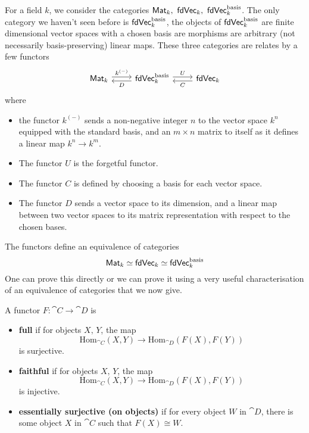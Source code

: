 \begin{example}\label{vectorspace}
For a field $k$, we consider the categories $\ncat{Mat}_k,\ \ncat{fdVec}_k,\ \ncat{fdVec}^{\text{basis}}_k$. The only category we haven't seen before is $\mathsf{fdVec}^{\text{basis}}_k$, the objects of $\mathsf{fdVec}^{\text{basis}}_k$ are finite dimensional vector spaces with a chosen basis are morphisms are arbitrary (not necessarily basis-preserving) linear maps. These three categories are relates by a few functors
\[\begin{tikzcd}
\ncat{Mat}_k \arrow[r, shift left, "k^{(-)}"] & \ncat{fdVec}^{\text{basis}}_k \arrow[r, shift left, "U"] \arrow[l, shift left, "D"] & \ncat{fdVec}_k \arrow[l, shift left, "C"]
\end{tikzcd}\]
where
\begin{itemize}
\item the functor $k^{(-)}$ sends a non-negative integer $n$ to the vector space $k^n$ equipped with the standard basis, and an $m\times n$ matrix to itself as it defines a linear map $k^n \to k^m$.
\item The functor $U$ is the forgetful functor.
\item The functor $C$ is defined by choosing a basis for each vector space.
\item The functor $D$ sends a vector space to its dimension, and a linear map between two vector spaces to its matrix representation with respect to the chosen bases.
\end{itemize}
The functors define an equivalence of categories
\[\mathsf{Mat}_k \simeq \mathsf{fdVec}_k \simeq \mathsf{fdVec}^{\text{basis}}_k\]
One can prove this directly or we can prove it using a very useful characterisation of an equivalence of categories that we now give.
\end{example}


\begin{definition}
A functor $F:\cat{C} \to \cat{D}$ is
\begin{itemize}
\item \textbf{full} if for objects $X,\,Y$, the map
\[\mathrm{Hom}_{\cat{C}}(X,Y) \to \mathrm{Hom}_{\cat{D}}(F(X),F(Y))\]
is surjective.
\item \textbf{faithful} if for objects $X,\,Y$, the map
\[\mathrm{Hom}_{\cat{C}}(X,Y) \to \mathrm{Hom}_{\cat{D}}(F(X),F(Y))\]
is injective.
\item \textbf{essentially surjective (on objects)} if for every object $W$ in $\cat{D}$, there is some object $X$ in $\cat{C}$ such that $F(X) \cong W$.
\end{itemize}
\end{definition}

